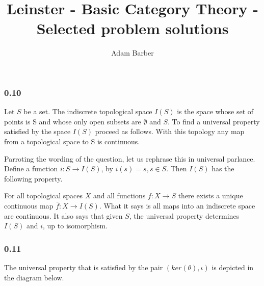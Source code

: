 \documentclass{article}
\begin{document}
\title{Leinster - Basic Category Theory - Selected problem solutions}
\author{Adam Barber}

\maketitle
\subsubsection*{0.10}

Let $S$ be a set. The indiscrete topological space $I(S)$ is the space whose set of points is S and whose only open subsets are $\emptyset$ and $S$.
To find a universal property satisfied by the space $I(S)$ proceed as follows.
With this topology any map from a topological space to S is continuous.

Parroting the wording of the question, let us rephrase this in
universal parlance. Define a function $i\colon S \rightarrow I(S)$, by $i(s) = s, s \in S$.
Then $I(S)$ has the following property.


\begin{center}
\end{center}

For all topological spaces $X$ and all functions
$f\colon X \rightarrow S$ there exists a unique continuous map $\bar{f}\colon X \rightarrow I(S)$. What it says is all maps into an indiscrete space are continuous. It also says that given $S$, the universal property determines $I(S)$ and $i$, up to isomorphism.

\subsubsection*{0.11}

The universal property that is satisfied by the pair $(ker(\theta),\iota)$ is depicted in the diagram below.

\begin{center}
\end{center}
\end{document}
